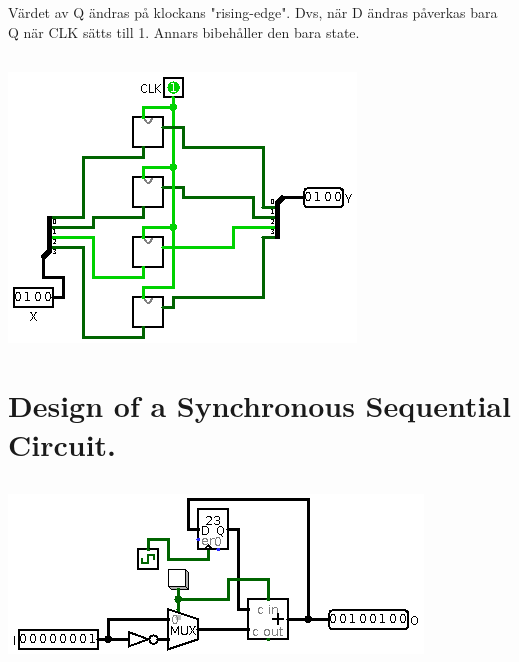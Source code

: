 \documentclass[11pt]{article}
\begin{document}
\subsubsection{}
\label{sec:orgheadline14}
Värdet av Q ändras på klockans "rising-edge". Dvs, när D ändras påverkas bara Q när CLK sätts till 1. Annars bibehåller den bara state.


\subsection{}
\label{sec:orgheadline16}
\includegraphics[width=.9\linewidth]{./assignment5-2.png}


\section{Design of a Synchronous Sequential Circuit.}
\label{sec:orgheadline21}

\subsection{}
\label{sec:orgheadline20}
\subsubsection{}
\label{sec:orgheadline18}

\includegraphics[width=.9\linewidth]{./assignment6-1.png}
\end{document}
